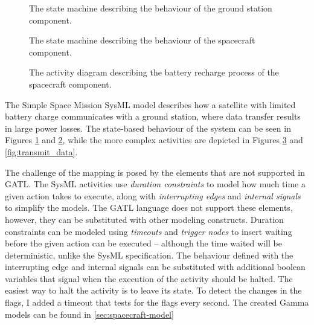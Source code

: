 \begin{figure}[]
	\centering
	
	\caption{The state machine describing the behaviour of the ground station component.}
	\label{fig:ground_station}
\end{figure}

\begin{figure}[]
	\centering
	
	\caption{The state machine describing the behaviour of the spacecraft component.}
	\label{fig:spacecraft_modes}
\end{figure}

\begin{figure}[]
	\centering
	
	\caption{The activity diagram describing the battery recharge process of the spacecraft component.}
	\label{fig:recharge_batteries}
\end{figure}

The Simple Space Mission SysML model describes how a satellite with limited battery charge communicates with a ground station, where data transfer results in large power losses. The state-based behaviour of the system can be seen in Figures \ref{fig:ground_station} and \ref{fig:spacecraft_modes}, while the more complex activities are depicted in Figures \ref{fig:recharge_batteries} and \ref{fig:transmit_data}.

The challenge of the mapping is posed by the elements that are not supported in GATL. The SysML activities use \emph{duration constraints} to model how much time a given action takes to execute, along with \emph{interrupting edges} and \emph{internal signals} to simplify the models. The GATL language does not support these elements, however, they can be substituted with other modeling constructs. Duration constraints can be modeled using \emph{timeouts} and \emph{trigger nodes} to insert waiting before the given action can be executed -- although the time waited will be deterministic, unlike the SysML specification. The behaviour defined with the interrupting edge and internal signals can be substituted with additional boolean variables that signal when the execution of the activity should be halted. The easiest way to halt the activity is to leave its state. To detect the changes in the flags, I added a timeout that tests for the flags every second. The created Gamma models can be found in \autoref{sec:spacecraft-model}

